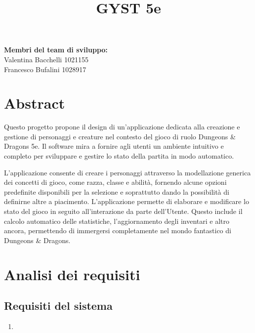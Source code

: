 \documentclass[a4paper, 11pt]{article}
\title{GYST 5e}
\date{}
\author{}
\begin{document}
\setlength{\parskip}{6pt}
\setlength{\parindent}{12pt}
\maketitle

\begin{flushright}
\textbf{Membri del team di sviluppo:}
\\Valentina Bacchelli 1021155
\\Francesco Bufalini 1028917
\end{flushright}



\newpage
\tableofcontents



\newpage
\section{Abstract}
Questo progetto propone il design di un'applicazione dedicata alla creazione e gestione di personaggi e creature nel contesto del gioco di ruolo Dungeons \& Dragons 5e. Il software mira a fornire agli utenti un ambiente intuitivo e completo per sviluppare e gestire lo stato della partita in modo automatico.

L'applicazione consente di creare i personaggi attraverso la modellazione generica dei concetti di gioco, come razza, classe e abilità, fornendo alcune opzioni predefinite disponibili per la selezione e soprattutto dando la possibilità di definirne altre a piacimento. L'applicazione permette di elaborare e modificare lo stato del gioco in seguito all'interazione da parte dell'Utente. Questo include il calcolo automatico delle statistiche, l'aggiornamento degli inventari e altro ancora, permettendo di immergersi completamente nel mondo fantastico di Dungeons \& Dragons.



\newpage
\section{Analisi dei requisiti}
\subsection{Requisiti del sistema}

\begin{enumerate}
    \item 
\end{enumerate}
\end{document}
